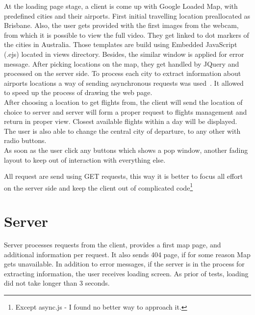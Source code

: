 \documentclass[12pt]{article}
\numberwithin{equation}{section} %
\numberwithin{figure}{section} %
\numberwithin{table}{section} %
\begin{document}
	At the loading page stage, a client is come up with Google Loaded Map, with predefined cities and their airports. First initial travelling location preallocated as Brisbane. Also, the user gets provided with the first images from the webcam, from which it is possible to view the full video. They get linked to dot markers of the cities in Australia. Those templates are build using Embedded JavaScript (.ejs) located in views directory. Besides, the similar window is applied for error message. After picking locations on the map, they get handled by JQuery and processed on the server side.
	To process each city to extract information about airports locations a way of sending asynchronous requests was used~\cite{mcmahon_async_2018}. It allowed to speed up the process of drawing the web page. \\
	
	After choosing a location to get flights from, the client will send the location of choice to server and server will form a proper request to flights management and return in proper view. Closest available flights within a day will be displayed. The user is also able to change the central city of departure, to any other with radio buttons. \\
	
	As soon as the user click any buttons which shows a pop window, another fading layout to keep out of interaction with everything else.
	
	All request are send using GET requests, this way it is better to focus all effort on the server side and keep the client out of complicated code\footnote{Except async.js - I found no better way to approach it.}
\section{Server}
	Server processes requests from the client, provides a first map page, and additional information per request. It also sends 404 page, if for some reason Map gets unavailable. In addition to error messages, if the server is in the process for extracting information, the user receives loading screen. As prior of tests, loading did not take longer than 3 seconds. \\    
	
\end{document}
